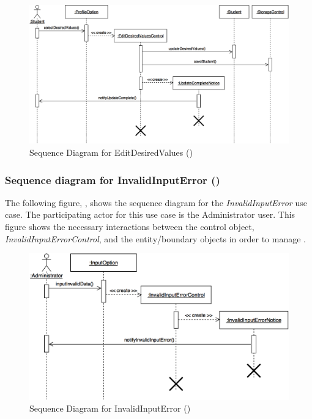\documentclass[12pt,letterpaper]{article}
\begin{document}
\begin{figure}[H]
	\centering{}
	\includegraphics[scale=0.25]{imgs/seq/edit-desired-values.png}
	\caption[ - Sequence Diagram for EditDesiredValues]{Sequence Diagram for EditDesiredValues ()}
\end{figure}

\subsubsection*{Sequence diagram for InvalidInputError ()}

The following figure, , shows the sequence diagram for the {\it InvalidInputError} use case. The participating actor for this use case is
the Administrator user. This figure shows the necessary interactions between the control object, {\it InvalidInputErrorControl}, and the
entity/boundary objects in order to manage .

\begin{figure}[H]
	\centering{}
	\includegraphics[scale=0.27]{imgs/seq/invalid-input-error.png}
	\caption[ - Sequence Diagram for InvalidInputError]{Sequence Diagram for InvalidInputError ()}
\end{figure}
\end{document}
